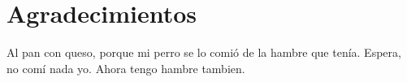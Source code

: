 \chapter*{Agradecimientos}
Al pan con queso, porque mi perro se lo comió de la hambre que tenía. Espera, no comí nada yo. Ahora tengo hambre tambien.